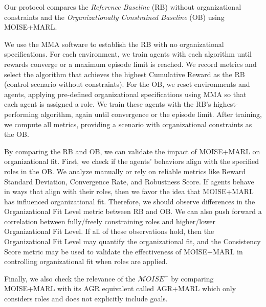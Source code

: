 \documentclass[pdflatex,sn-mathphys-num]{sn-jnl}%
\theoremstyle{thmstyleone}%
\theoremstyle{thmstyletwo}%
\theoremstyle{thmstylethree}%
\begin{document}
\noindent Our protocol compares the \textit{Reference Baseline} (RB) without organizational constraints and the \textit{Organizationally Constrained Baseline} (OB) using MOISE+MARL.

We use the MMA software to establish the RB with no organizational specifications. For each environment, we train agents with each algorithm until rewards converge or a maximum episode limit is reached. We record metrics and select the algorithm that achieves the highest Cumulative Reward as the RB (control scenario without constraints).
%
For the OB, we reset environments and agents, applying pre-defined organizational specifications using MMA so that each agent is assigned a role. We train these agents with the RB's highest-performing algorithm, again until convergence or the episode limit. After training, we compute all metrics, providing a scenario with organizational constraints as the OB.

By comparing the RB and OB, we can validate the impact of MOISE+MARL on organizational fit. First, we check if the agents' behaviors align with the specified roles in the OB. We analyze manually or rely on reliable metrics like Reward Standard Deviation, Convergence Rate, and Robustness Score. If agents behave in ways that align with their roles, then we favor the idea that MOISE+MARL has influenced organizational fit.
%
Therefore, we should observe differences in the Organizational Fit Level metric between RB and OB. We can also push forward a correlation between fully/freely constraining roles and higher/lower Organizational Fit Level. If all of these observations hold, then the Organizational Fit Level may quantify the organizational fit, and the Consistency Score metric may be used to validate the effectiveness of MOISE+MARL in controlling organizational fit when roles are applied.

Finally, we also check the relevance of the $\mathcal{M}OISE^+$ by comparing MOISE+MARL with its AGR equivalent called AGR+MARL which only considers roles and  does not explicitly include goals.
\end{document}
